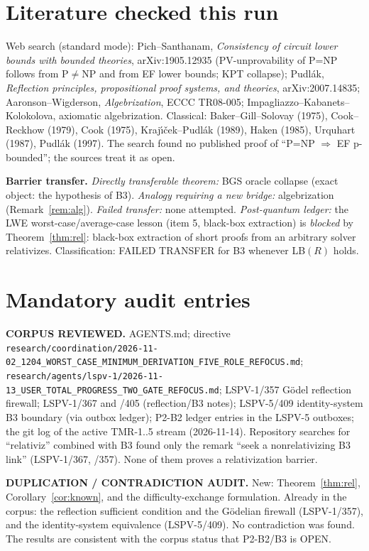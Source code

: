 \documentclass[11pt]{article}
\begin{document}
\section{Literature checked this run}
Web search (standard mode): Pich--Santhanam, \emph{Consistency of circuit lower bounds with bounded theories}, arXiv:1905.12935 (PV-unprovability of P=NP follows from P$\neq$NP and from EF lower bounds; KPT collapse); Pudl\'ak, \emph{Reflection principles, propositional proof systems, and theories}, arXiv:2007.14835; Aaronson--Wigderson, \emph{Algebrization}, ECCC TR08-005; Impagliazzo--Kabanets--Kolokolova, axiomatic algebrization. Classical: Baker--Gill--Solovay (1975), Cook--Reckhow (1979), Cook (1975), Kraj\'{\i}\v{c}ek--Pudl\'ak (1989), Haken (1985), Urquhart (1987), Pudl\'ak (1997). The search found no published proof of ``P=NP $\Rightarrow$ EF p-bounded''; the sources treat it as open.

\noindent\textbf{Barrier transfer.} \emph{Directly transferable theorem:} BGS oracle collapse (exact object: the hypothesis of B3). \emph{Analogy requiring a new bridge:} algebrization (Remark~\ref{rem:alg}). \emph{Failed transfer:} none attempted. \emph{Post-quantum ledger:} the LWE worst-case/average-case lesson (item 5, black-box extraction) is \emph{blocked} by Theorem~\ref{thm:rel}: black-box extraction of short proofs from an arbitrary solver relativizes. Classification: FAILED TRANSFER for B3 whenever LB$(R)$ holds.

\section{Mandatory audit entries}
\textbf{CORPUS REVIEWED.} AGENTS.md; directive \texttt{research/coordination/2026-11-02\_1204\_WORST\_CASE\_MINIMUM\_DERIVATION\_FIVE\_ROLE\_REFOCUS.md}; \texttt{research/agents/lspv-1/2026-11-13\_USER\_TOTAL\_PROGRESS\_TWO\_GATE\_REFOCUS.md}; LSPV-1/357 G\"odel reflection firewall; LSPV-1/367 and /405 (reflection/B3 notes); LSPV-5/409 identity-system B3 boundary (via outbox ledger); P2-B2 ledger entries in the LSPV-5 outboxes; the git log of the active TMR-1..5 stream (2026-11-14). Repository searches for ``relativiz'' combined with B3 found only the remark ``seek a nonrelativizing B3 link'' (LSPV-1/367, /357). None of them proves a relativization barrier.

\textbf{DUPLICATION / CONTRADICTION AUDIT.} New: Theorem~\ref{thm:rel}, Corollary~\ref{cor:known}, and the difficulty-exchange formulation. Already in the corpus: the reflection sufficient condition and the G\"odelian firewall (LSPV-1/357), and the identity-system equivalence (LSPV-5/409). No contradiction was found. The results are consistent with the corpus status that P2-B2/B3 is OPEN.
\end{document}
